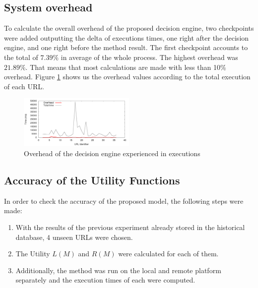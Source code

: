 \documentclass[10pt, conference, letterpaper]{IEEEtran}
\begin{document}
\subsection{System overhead}

To calculate the overall overhead of the proposed decision engine, two checkpoints were added outputting the delta of executions times, one right after the decision engine, and one right before the method result. The first checkpoint accounts to the total of $7.39\%$ in average of the whole process. The highest overhead was $21.89\%$. That means that most calculations are made with less than 10\% overhead. Figure \ref{fig:overheadexec} shows us the overhead values according to the total execution of each URL.

\begin{figure}[t]
  \centering
  \includegraphics[width=0.5\textwidth]{results/plots/overhead/overhead.png}
  \caption{Overhead of the decision engine experienced in executions}
  \label{fig:overheadexec}
\end{figure}



  \subsection{Accuracy of the Utility Functions}

  In order to check the accuracy of the proposed model, the following steps were made:
  \begin{enumerate}
    \item With the results of the previous experiment already stored in the historical database, 4 unseen URLs were chosen.
    \item The Utility $L(M)$ and $R(M)$ were calculated for each of them.
    \item Additionally, the method was run on the local and remote platform separately and the execution times of each were computed.
  \end{enumerate}
\end{document}

